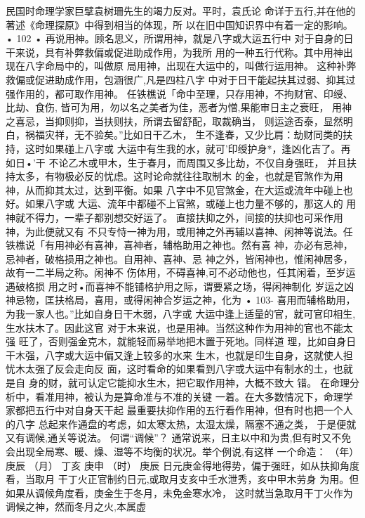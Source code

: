 民国时命理学家巨擘袁树珊先生的竭力反对。平时，袁氏论
命详于五行,并在他的著述《命理探原》中得到相当的体现，所
以在旧中国知识界中有着一定的影响。
• 102 •
再说用神。顾名思义，所谓用神，就是八字或大运五行中
对于自身的日干来说，具有补弊救偏或促进助成作用，为我所
用的一种五行代称。其中用神出现在八字命局中的，叫做原
局用神，出现在大运中的，叫做行运用神。
这种补弊救偏或促进助成作用，包涵很广,凡是四柱八字
中对于日干能起扶其过弱、抑其过强作用的，都可取作用神。
任铁樵说「命中至理，只存用神，不拘财官、印绶、比劫、食伤,
皆可为用，勿以名之美者为佳，恶者为憎,果能审日主之衰旺，
用神之喜忌，当抑则抑，当扶则扶，所谓去留舒配，取裁确当，
则运途否泰，显然明白，祸福灾祥，无不验矣。”比如日干乙木，
生不逢春，又少比肩：劫财同类的扶持，这时如果碰上八字或
大运中有生我的水，就可'印绶护身*，逢凶化吉了。再如日•'干
不论乙木或甲木，生于春月，而周围又多比劫，不仅自身强旺，
并且扶持太多，有物极必反的忧虑。这时论命就往往取制木
的金，也就是官煞作为用神，从而抑其太过，达到平衡。如果
八字中不见官煞金，在大运或流年中碰上也好。如果八字或
大运、流年中都碰不上官煞，或碰上也力量不够的，那这人的
用神就不得力，一辈子都别想交好运了。
直接扶抑之外，间接的扶抑也可采作用神，为此便就又有
不只专恃一神为用，或用神之外再辅以喜神、闲神等说法。任
铁樵说「有用神必有喜神，喜神者，辅格助用之神也。然有喜
神，亦必有忌神，忌神者，破格损用之神也。自用神、喜神、忌
神之外，皆闲神也，惟闲神居多，故有一二半局之称。闲神不
伤体用，不碍喜神,可不必动他也，任其闲着，至岁运遇破格损
用之时•而喜神不能铺格护用之际，谓要紧之场，得闲神制化
岁运之凶神忌物，匡扶格局，喜用，或得闲神合岁运之神，化为
• 103-
喜用而辅格助用，为我一家人也。”比如自身日干木弱，八字或
大运中逢上适量的官，就可官印相生,生水扶木了。因此这官
对于木来说，也是用神。当然这种作为用神的官也不能太强
旺了，否则强金克木，就能轻而易举地把木置于死地。同样道
理，比如自身日干木强，八字或大运中偏又逢上较多的水来
生木，也就是印生自身，这就使人担忧木太强了反会走向反
面，这时看命的如果看到八字或大运中有制水的土，也就是自
身的财，就可认定它能抑水生木，把它取作用神，大概不致大
错。
在命理分析中，看准用神，被认为是算命准与不准的关键
一着。在大多数情况下，命理学家都把五行中对自身天干起
最重要扶抑作用的五行看作用神，但有时也把一个人的八字
总起来作通盘的考虑，如太寒太热，太湿太燥，隔塞不通之类，
于是便就又有调候,通关等说法。
何谓“调候”？ 通常说来，日主以中和为贵,但有时又不免
会出现全局寒、暖、燥、湿等不均衡的状况。举个例说,有这样
一个命造：
（年） 庚辰
（月） 丁亥
庚申
（时） 庚辰
日元庚金得地得势，偏于强旺，如从扶抑角度看，当取月
干丁火正官制约日元,或取月支亥中壬水泄秀，亥中甲木劳身
为用。但如果从调候角度看，庚金生于冬月，未免金寒水冷，
这时就当急取月干丁火作为调候之神，然而冬月之火,本属虚
